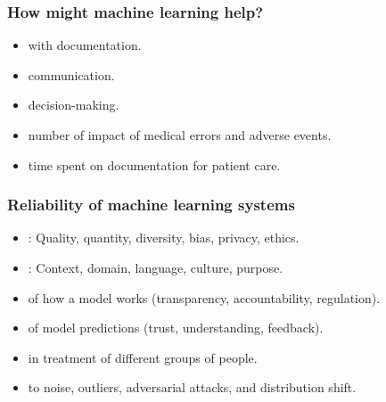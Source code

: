 \begin{frame}
    \frametitle{How might machine learning help?}
    \begin{itemize}
        \item <1->  with documentation.
        \item <1->  communication.
        \item <1->  decision-making.
        \vspace{1em}
        \item <2->  number of impact of medical errors and adverse events.
        \item <2->  time spent on documentation for patient care.
    \end{itemize}
\end{frame}


\begin{frame}
    \frametitle{Reliability of machine learning systems}
    \begin{itemize}
        \item <1-> : Quality, quantity, diversity, bias, privacy, ethics.
        \item <2-> : Context, domain, language, culture, purpose.
        \vspace{1em}
        \item <3->  of how a model works (transparency, accountability, regulation).
        \item <4->  of model predictions (trust, understanding, feedback).
        \item <5->  in treatment of different groups of people.
        \item <6->  to noise, outliers, adversarial attacks, and distribution shift.
    \end{itemize}
\end{frame}
